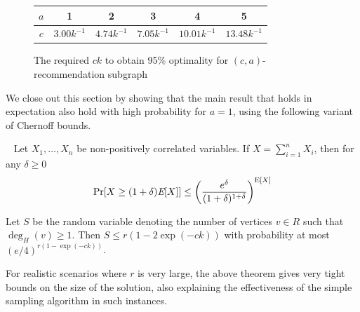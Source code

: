 \begin{figure}[H]
  \centering
  \begin{tabular}{ |c|c|c|c|c|c| }
    \hline
    $a$ & 1 & 2 & 3 & 4 & 5 \\ \hline
    $c$ & $3.00k^{-1}$ & $4.74k^{-1}$ & $7.05k^{-1}$ & $10.01k^{-1}$ & $13.48k^{-1}$ \\
    \hline
  \end{tabular}
  \caption{The required $ck$ to obtain 95\% optimality for $(c, a)$-recommendation subgraph}
  \label{a-values}
\end{figure}


We close out this section by showing that the main result that holds
in expectation also hold with high probability for $a=1$, using the
following variant of Chernoff bounds.

\begin{thm}\label{negative_corr_chernoff}~\cite{AugerDoerr2011}
Let $X_1,\ldots, X_n$ be non-positively correlated variables. If $X=\sum_{i=1}^n X_i$, then for any $\delta\geq 0$
\[ \Pr[X \geq (1+\delta)\emph{\text{E}}[X] ] \leq \left(\frac{e^\delta}{(1+\delta)^{1+\delta}}\right)^{\text{E}[X]} \]
\end{thm}


\begin{thm}
Let $S$ be the random variable denoting the number of vertices $v \in R$ such that $\deg_{H}(v)\geq 1$. Then
$ S \leq r(1-2\exp(-ck))$ with probability at most $(e/4)^{r(1-\exp(-ck))}$.
\end{thm}


For realistic scenarios where $r$ is very large, the above theorem gives very tight bounds on the size of the solution, also explaining the effectiveness of the simple sampling algorithm in such instances.

